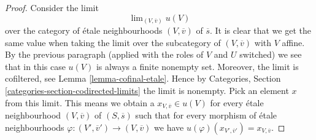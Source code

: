 \documentclass[10pt,a4paper]{amsart}
\theoremstyle{plain}
\theoremstyle{definition}
\theoremstyle{remark}
\numberwithin{equation}{subsection}
\def\lim{\mathop{\mathrm{lim}}\nolimits}
\begin{document}
\begin{proof}
\medskip\noindent
Consider the limit
$$
\lim_{(V, \overline{v})} u(V)
$$
over the category of \'etale neighbourhoods $(V, \overline{v})$ of
$\overline{s}$. It is clear that we get the same value when taking
the limit over the subcategory of $(V, \overline{v})$ with $V$ affine.
By the previous paragraph (applied with the roles of $V$ and $U$ switched)
we see that in this case $u(V)$ is always a finite nonempty set.
Moreover, the limit is cofiltered, see
Lemma \ref{lemma-cofinal-etale}.
Hence by
Categories, Section \ref{categories-section-codirected-limits}
the limit is nonempty. Pick an element $x$ from this limit.
This means we obtain a $x_{V, \overline{v}} \in u(V)$ for
every \'etale neighbourhood $(V, \overline{v})$ of $(S, \overline{s})$
such that for every morphism of \'etale neighbourhoods
$\varphi : (V', \overline{v}') \to (V, \overline{v})$ we have
$u(\varphi)(x_{V', \overline{v}'}) = x_{V, \overline{v}}$.


\end{proof}
\end{document}
